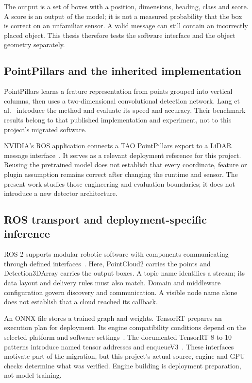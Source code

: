 \documentclass[11pt,a4paper]{article}
\begin{document}
The output is a set of boxes with a position, dimensions, heading, class and
score. A score is an output of the model; it is not a measured probability that
the box is correct on an unfamiliar sensor. A valid message can still contain
an incorrectly placed object. This thesis therefore tests the software interface
and the object geometry separately.

\subsection{PointPillars and the inherited implementation}
PointPillars learns a feature representation from points grouped into vertical
columns, then uses a two-dimensional convolutional detection network. Lang et
al.~\cite{pointpillars} introduce the method and evaluate its speed and accuracy.
Their benchmark results belong to that published implementation and experiment,
not to this project's migrated software.

NVIDIA's ROS application connects a TAO PointPillars export to a LiDAR message
interface~\cite{nvidiaros}. It serves as a relevant deployment reference for this
project. Reusing the pretrained model does not establish that every coordinate,
feature or plugin assumption remains correct after changing the runtime and
sensor. The present work studies those engineering and evaluation boundaries;
it does not introduce a new detector architecture.

\subsection{ROS transport and deployment-specific inference}
ROS 2 supports modular robotic software with components communicating through
defined interfaces~\cite{ros2}. Here, PointCloud2 carries the points and
Detection3DArray carries the output boxes. A topic name identifies a stream;
its data layout and delivery rules must also match. Domain and middleware
configuration govern discovery and communication. A visible node name alone
does not establish that a cloud reached its callback.

An ONNX file stores a trained graph and weights. TensorRT prepares an execution
plan for deployment. Its engine compatibility conditions depend on the selected
platform and software settings~\cite{trtsupport}. The documented TensorRT 8-to-10
patterns introduce named tensor addresses and enqueueV3~\cite{trtmigration}.
These interfaces motivate part of the migration, but this project's actual
source, engine and GPU checks determine what was verified. Engine building is
deployment preparation, not model training.
\end{document}

